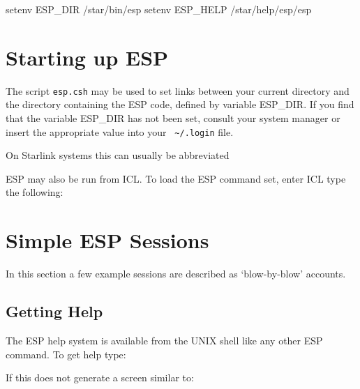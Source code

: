 \documentclass[twoside,11pt]{starlink}
\begin{document}
\begin{terminalv}
setenv ESP_DIR /star/bin/esp
setenv ESP_HELP /star/help/esp/esp
\end{terminalv}

\section{Starting up ESP}
\label{sec:starting}

The script \texttt{esp.csh} may be used to set links between your current
directory and the directory containing the ESP code, defined by
variable ESP\_DIR.  If you find that the variable ESP\_DIR has not been
set, consult your system manager or insert the appropriate value into
your {\verb+ ~/.login+} file.

\begin{terminalv}
\end{terminalv}
On Starlink systems this can usually be abbreviated
\begin{terminalv}
\end{terminalv}

ESP may also be run from ICL. To load the ESP command set, enter ICL type
the following:


\section{Simple ESP Sessions}
\label{sec:session}

In this section a few example sessions are described as `blow-by-blow'
accounts.


\subsection{Getting Help}

The ESP help system is available from the UNIX shell like any other ESP
command. To get help type:

\begin{terminalv}
\end{terminalv}

If this does not generate a screen similar to:
\end{document}
